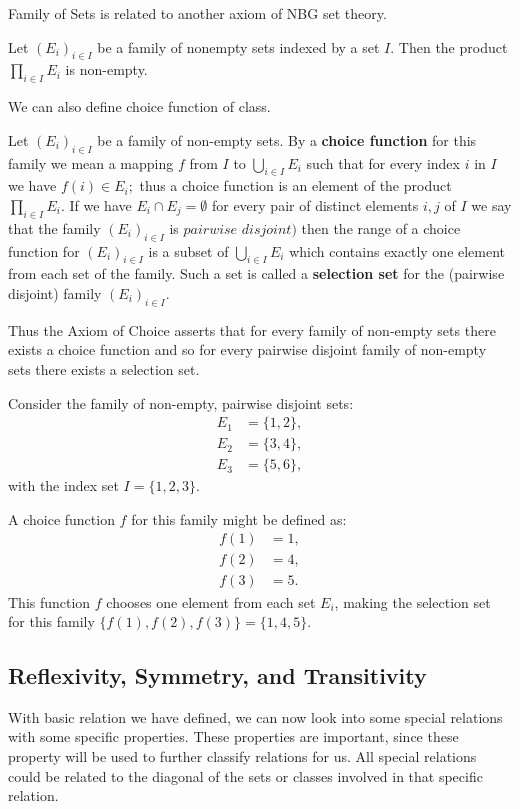 Family of Sets is related to another axiom of NBG set theory.
\begin{axiom}
	 Let $(E_i)_{i\in I}$ be a family of nonempty sets indexed by a set $I$. Then the product $\prod_{i\in I}E_i$ is non-empty.
\end{axiom}
We can also define choice function of class.
\begin{definition}
	Let $(E_i)_{i\in I}$ be a family of non-empty sets. By a \textbf{choice function} for this family we mean a mapping $f$ from $I$ to $\bigcup_{i\in I}E_i$ such that for every index $i$ in $I$ we have $f(i)\in E_i;$ thus a choice function is an element of the product $\prod_{i\in I}E_i.$ If we have $E_i\cap E_j=\emptyset$ for every pair of distinct elements $i, j$ of $I$ we say that the family $( E_i) _{i\in I}$ is $pairwise$ $disjoint)$ then the range of a choice function for $(E_i)_{i\in I}$ is a subset of $\bigcup_{i\in I}E_i$ which contains exactly one element from each set of the family. Such a set is called a \textbf{selection set} for the (pairwise disjoint) family $(E_i)_{i\in I}.$
\end{definition}
Thus the Axiom of Choice asserts that for every family of non-empty
sets there exists a choice function and so for every pairwise disjoint family
of non-empty sets there exists a selection set.
\begin{example}
	Consider the family of non-empty, pairwise disjoint sets:
	\begin{align*}
		E_1 &= \{1, 2\}, \\
		E_2 &= \{3, 4\}, \\
		E_3 &= \{5, 6\},
	\end{align*}
	with the index set \( I = \{1, 2, 3\} \).
	
	A choice function \( f \) for this family might be defined as:
	\begin{align*}
		f(1) &= 1, \\
		f(2) &= 4, \\
		f(3) &= 5.
	\end{align*}
	This function \( f \) chooses one element from each set \( E_i \), making the selection set for this family \(\{ f(1), f(2), f(3) \} = \{1, 4, 5\}\).
\end{example}
\subsection{Reflexivity, Symmetry, and Transitivity}
With basic relation we have defined, we can now look into some special relations with some specific properties. These properties are important, since these property will be used to further classify relations for us. All special relations could be related to the diagonal of the sets or classes involved in that specific relation.

